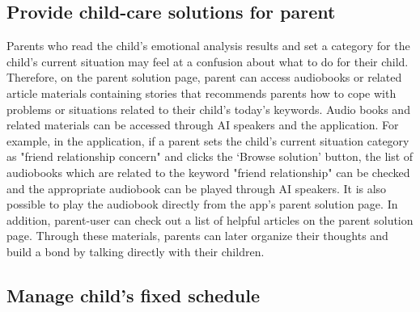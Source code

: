 \documentclass[conference]{IEEEtran}
\begin{document}
\subsection{Provide child-care solutions for parent}

Parents who read the child's emotional analysis results and set a category for the child's current situation may feel at a confusion about what to do for their child. Therefore, on the parent solution page, parent can access audiobooks or related article materials containing stories that recommends parents how to cope with problems or situations related to their child's today’s keywords. Audio books and related materials can be accessed through AI speakers and the application. For example, in the application, if a parent sets the child's current situation category as "friend relationship concern" and clicks the ‘Browse solution’ button, the list of audiobooks which are related to the keyword "friend relationship" can be checked and the appropriate audiobook can be played through AI speakers. It is also possible to play the audiobook directly from the app's parent solution page. In addition, parent-user can check out a list of helpful articles on the parent solution page. Through these materials, parents can later organize their thoughts and build a bond by talking directly with their children.

\subsection{Manage child’s fixed schedule}
\end{document}
